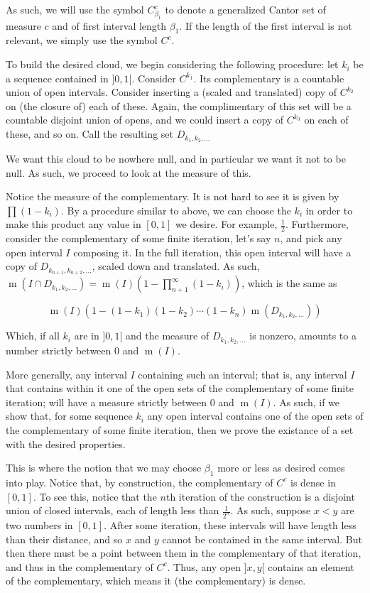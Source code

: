 \documentclass{article}
\DeclareMathOperator{\m}{m}
\begin{document}
	As such, we will use the symbol $C^c_{\beta_1}$ to denote a generalized Cantor set of measure $c$ and of first interval length $\beta_1$. If the length of the first interval is not relevant, we simply use the symbol $C^c$.
	
	To build the desired cloud, we begin considering the following procedure: let $k_i$ be a sequence contained in $]0,1[$. Consider $C^{k_1}$. Its complementary is a countable union of open intervals. Consider inserting a (scaled and translated) copy of $C^{k_2}$ on (the closure of) each of these. Again, the complimentary of this set will be a countable disjoint union of opens, and we could insert a copy of $C^{k_3}$ on each of these, and so on. Call the resulting set $D_{k_1, k_2, \ldots}$
	
	We want this cloud to be nowhere null, and in particular we want it not to be null. As such, we proceed to look at the measure of this.
	
	Notice the measure of the complementary. It is not hard to see it is given by $\prod (1 - k_i)$. By a procedure similar to above, we can choose the $k_i$ in order to make this product any value in $[0,1]$ we desire. For example, $\frac 1 2$. Furthermore, consider the complementary of some finite iteration, let's say $n$, and pick any open interval $I$ composing it. In the full iteration, this open interval will have a copy of $D_{k_{n+1}, k_{n+2}, \ldots}$, scaled down and translated. As such, $\m(I \cap D_{k_1, k_2, \ldots}) = \m(I) (1 - \prod_{n+1}^\infty (1 - k_i))$, which is the same as
	
	\[\m(I) (1 - (1 - k_1)(1-k_2)\cdots(1-k_n) \m(D_{k_1, k_2, \ldots}))\]
	
	Which, if all $k_i$ are in $]0,1[$ and the measure of $D_{k_1, k_2, \ldots}$ is nonzero, amounts to a number strictly between 0 and $\m(I)$.
	
	More generally, any interval $I$ containing such an interval; that is, any interval $I$ that contains within it one of the open sets of the complementary of some finite iteration; will have a measure strictly between 0 and $\m(I)$. As such, if we show that, for some sequence $k_i$ any open interval contains one of the open sets of the complementary of some finite iteration, then we prove the existance of a set with the desired properties.
	
	This is where the notion that we may choose $\beta_1$ more or less as desired comes into play. Notice that, by construction, the complementary of $C^c$ is dense in $[0,1]$. To see this, notice that the $n$th iteration of the construction is a disjoint union of closed intervals, each of length less than $\frac 1 {2^n}$. As such, suppose $x < y$ are two numbers in $[0,1]$. After some iteration, these intervals will have length less than their distance, and so $x$ and $y$ cannot be contained in the same interval. But then there must be a point between them in the complementary of that iteration, and thus in the complementary of $C^c$. Thus, any open $]x,y[$ contains an element of the complementary, which means it (the complementary) is dense.
	
\end{document}
